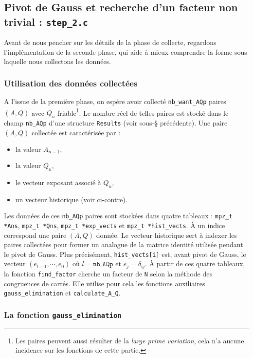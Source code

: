 \subsection{Pivot de Gauss et recherche d'un facteur non trivial :
\texttt{step\_2.c}}

Avant de nous pencher sur les détails de la phase de collecte, regardons 
l'implémentation de la seconde phase, qui aide à mieux comprendre la 
forme sous laquelle nous collectons les données.

\subsubsection{Utilisation des données collectées}

A l'issue de la première phase, on espère avoir collecté \texttt{nb\_want\_AQp}
paires $(A,Q)$ avec $Q_n$ friable\footnote{Les paires peuvent aussi résulter de
la \textit{large prime variation}, cela n'a aucune incidence sur les fonctions
de cette partie.}. Le nombre réel de telles paires est stocké dans le champ
\texttt{nb\_AQp} d'une structure \texttt{Results} (voir sous-§ précédente). Une
paire $(A,Q)$ collectée est caractérisée par :

\begin{itemize}
    \item la valeur $A_{n-1}$,
    \item la valeur $Q_n$,
    \item le vecteur exposant associé à $Q_n$,
    \item un vecteur historique (voir ci-contre).
\end{itemize}

Les données de ces \texttt{nb\_AQp} paires sont stockées dans quatre tableaux :
\texttt{mpz\_t *Ans}, \texttt{mpz\_t *Qns}, \texttt{mpz\_t *exp\_vects} et
\texttt{mpz\_t *hist\_vects}. À un indice correspond une paire $(A,Q)$ donnée.
Le vecteur historique sert à indexer les paires collectées pour former un
analogue de la matrice identité utilisée pendant le pivot de Gauss. Plus
précisément, \texttt{hist\_vects[i]} est, avant pivot de Gauss, le vecteur
$(e_{l-1}, \cdots, e_0)$ où $l=\texttt{nb\_AQp}$ et $e_j = \delta_{ij}$. À
partir de ces quatre tableaux, la fonction \texttt{find\_factor} cherche un
facteur de \texttt{N} selon la méthode des congruences de carrés. Elle utilise
pour cela les fonctions auxiliaires \texttt{gauss\_elimination} et
\texttt{calculate\_A\_Q}. 

\subsubsection{La fonction \texttt{gauss\_elimination}}

